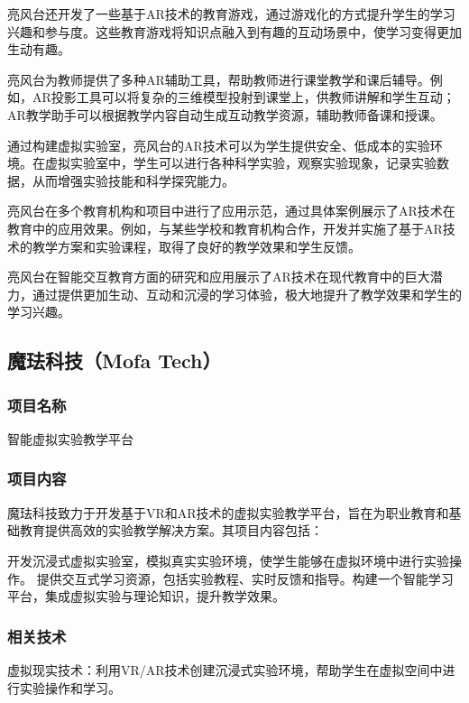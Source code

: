 亮风台还开发了一些基于AR技术的教育游戏，通过游戏化的方式提升学生的学习兴趣和参与度。这些教育游戏将知识点融入到有趣的互动场景中，使学习变得更加生动有趣。

亮风台为教师提供了多种AR辅助工具，帮助教师进行课堂教学和课后辅导。例如，AR投影工具可以将复杂的三维模型投射到课堂上，供教师讲解和学生互动；AR教学助手可以根据教学内容自动生成互动教学资源，辅助教师备课和授课。

通过构建虚拟实验室，亮风台的AR技术可以为学生提供安全、低成本的实验环境。在虚拟实验室中，学生可以进行各种科学实验，观察实验现象，记录实验数据，从而增强实验技能和科学探究能力。

亮风台在多个教育机构和项目中进行了应用示范，通过具体案例展示了AR技术在教育中的应用效果。例如，与某些学校和教育机构合作，开发并实施了基于AR技术的教学方案和实验课程，取得了良好的教学效果和学生反馈。

亮风台在智能交互教育方面的研究和应用展示了AR技术在现代教育中的巨大潜力，通过提供更加生动、互动和沉浸的学习体验，极大地提升了教学效果和学生的学习兴趣。

\subsection{魔珐科技（Mofa Tech）}\label{魔珐科技（Mofa Tech）}

\subsubsection{项目名称}

智能虚拟实验教学平台

\subsubsection{项目内容}

魔珐科技致力于开发基于VR和AR技术的虚拟实验教学平台，旨在为职业教育和基础教育提供高效的实验教学解决方案。其项目内容包括：

开发沉浸式虚拟实验室，模拟真实实验环境，使学生能够在虚拟环境中进行实验操作。
提供交互式学习资源，包括实验教程、实时反馈和指导。构建一个智能学习平台，集成虚拟实验与理论知识，提升教学效果。

\subsubsection{相关技术}

虚拟现实技术：利用VR/AR技术创建沉浸式实验环境，帮助学生在虚拟空间中进行实验操作和学习。

